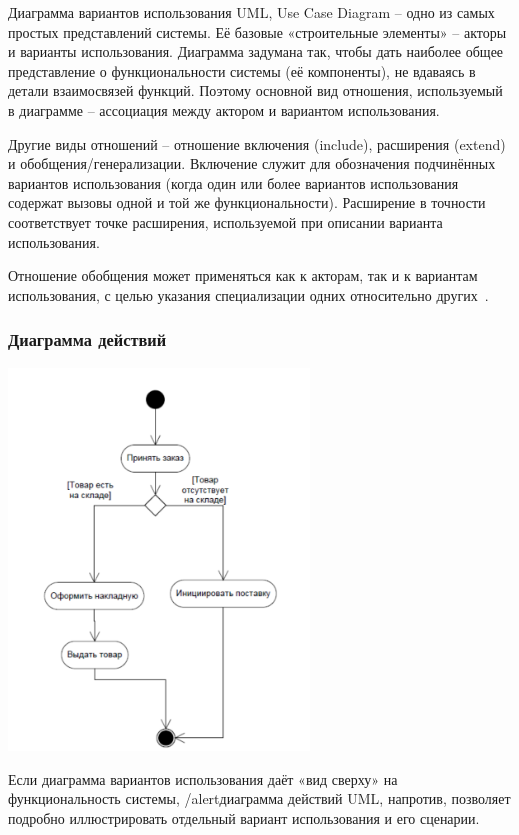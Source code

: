 \documentclass{../industrial-development}
\begin{document}
\lecturenotes

\alert{Диаграмма вариантов использования UML, Use Case Diagram} – одно из самых простых представлений системы. Её базовые «строительные элементы» – акторы и варианты использования. Диаграмма задумана так, чтобы дать наиболее общее
представление о функциональности системы (её компоненты), не вдаваясь в детали
взаимосвязей функций. Поэтому основной вид отношения, используемый в диаграмме –
ассоциация между актором и вариантом использования.

Другие виды отношений – отношение включения (include), расширения (extend) и
обобщения/генерализации. Включение служит для обозначения подчинённых вариантов использования (когда один или более вариантов использования содержат вызовы одной и той же
функциональности). Расширение в точности соответствует точке расширения, используемой при
описании варианта использования.

Отношение обобщения может применяться как к акторам, так и к вариантам
использования, с целью указания специализации одних относительно других~\cite[с.~46]{Maglinec}.


\begin{frame} \frametitle {Диаграмма действий}
 \centerline{\includegraphics[width=0.6\textwidth]{pict5.pdf}}
\end{frame}

\lecturenotes

Если диаграмма вариантов использования даёт «вид сверху» на функциональность системы, /alert{диаграмма действий UML}, напротив, позволяет подробно иллюстрировать отдельный вариант использования и его сценарии.
\end{document}
